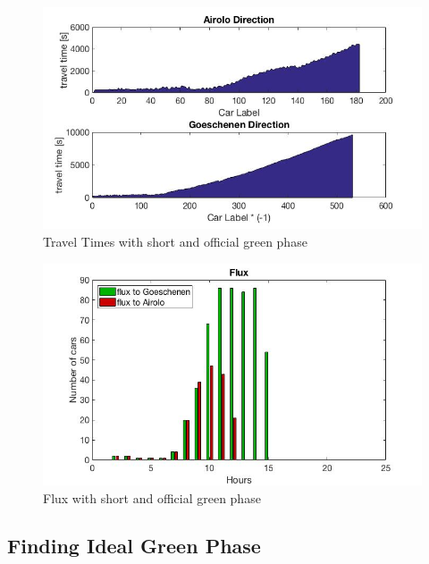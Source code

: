 \documentclass[11pt,a4paper,parskip=half-]{article}
\begin{document}
\begin{figure}[h!]
\includegraphics[scale=0.65]{traveltimesshortreal}
\centering
\vspace*{-4mm}
\caption{Travel Times with short and official green phase}
\label{fig:traveltimes2_40}
\end{figure}
\begin{figure}[h!]
\includegraphics[scale=0.65]{fluxshortreal}
\centering
\vspace*{-4mm}
\caption{Flux with short and official green phase}
\label{fig:flux2_40}
\end{figure}






\clearpage





\subsection{Finding Ideal Green Phase}
\end{document}
